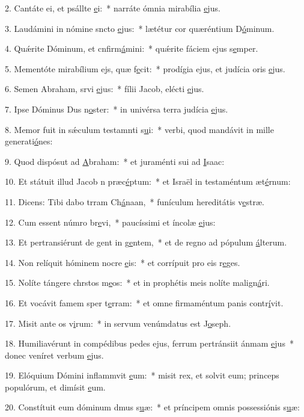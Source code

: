 2. Cantáte ei, et psállte \uline{e}i:~* narráte ómnia mirabília \uline{e}jus.\par 
3. Laudámini in nómine sncto \uline{e}jus:~* lætétur cor quæréntium D\uline{ó}minum.\par 
4. Quǽrite Dóminum, et cnfirm\uline{á}mini:~* quǽrite fáciem ejus s\uline{e}mper.\par 
5. Mementóte mirabílium ejs, quæ f\uline{e}cit:~* prodígia ejus, et judícia oris \uline{e}jus.\par 
6. Semen Abraham, srvi \uline{e}jus:~* fílii Jacob, elécti \uline{e}jus.\par 
7. Ipse Dóminus Dus n\uline{o}ster:~* in univérsa terra judícia \uline{e}jus.\par 
8. Memor fuit in sǽculum testamnti s\uline{u}i:~* verbi, quod mandávit in mille generati\uline{ó}nes:\par 
9. Quod dispósut ad \uline{A}braham:~* et juraménti sui ad \uline{I}saac:\par 
10. Et státuit illud Jacob n præc\uline{é}ptum:~* et Israël in testaméntum æt\uline{é}rnum:\par 
11. Dicens: Tibi dabo trram Ch\uline{á}naan,~* funículum hereditátis v\uline{e}stræ.\par 
12. Cum essent númro br\uline{e}vi,~* paucíssimi et íncolæ \uline{e}jus:\par 
13. Et pertransiérunt de gent in g\uline{e}ntem,~* et de regno ad pópulum \uline{á}lterum.\par 
14. Non relíquit hóminem nocre \uline{e}is:~* et corrípuit pro eis r\uline{e}ges.\par 
15. Nolíte tángere chrstos m\uline{e}os:~* et in prophétis meis nolíte malign\uline{á}ri.\par 
16. Et vocávit famem sper t\uline{e}rram:~* et omne firmaméntum panis contr\uline{í}vit.\par 
17. Misit ante os v\uline{i}rum:~* in servum venúmdatus est J\uline{o}seph.\par 
18. Humiliavérunt in compédibus pedes ejus, ferrum pertránsiit ánmam \uline{e}jus~* donec veníret verbum \uline{e}jus.\par 
19. Elóquium Dómini inflammvit \uline{e}um:~* misit rex, et solvit eum; princeps populórum, et dimísit \uline{e}um.\par 
20. Constítuit eum dóminum dmus s\uline{u}æ:~* et príncipem omnis possessiónis s\uline{u}æ:\par 
